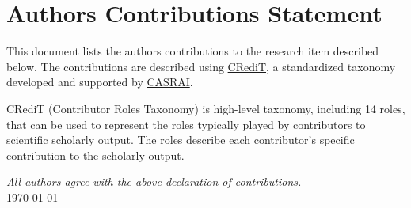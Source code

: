 \documentclass[a4paper]{article}
\newlength{\colauthlen}
\newlength{\minorskip}
\newlength{\majorskip}
\begin{document}

\section*{Authors Contributions Statement}
\thispagestyle{empty}

This document lists the authors contributions to the research item described below.
The contributions are described using \href{https://www.casrai.org/credit.html}{CRediT}, a standardized taxonomy developed and supported by \href{https://www.casrai.org/}{CASRAI}.

CRediT (Contributor Roles Taxonomy) is high-level taxonomy, including 14 roles, that can be used to represent the roles typically played by contributors to scientific scholarly output. The roles describe each contributor’s specific contribution to the scholarly output.

\vspace{\majorskip}






\vspace{\majorskip}

\textit{All authors agree with the above declaration of contributions.} \\[0.3\minorskip]
\today

\end{document}
